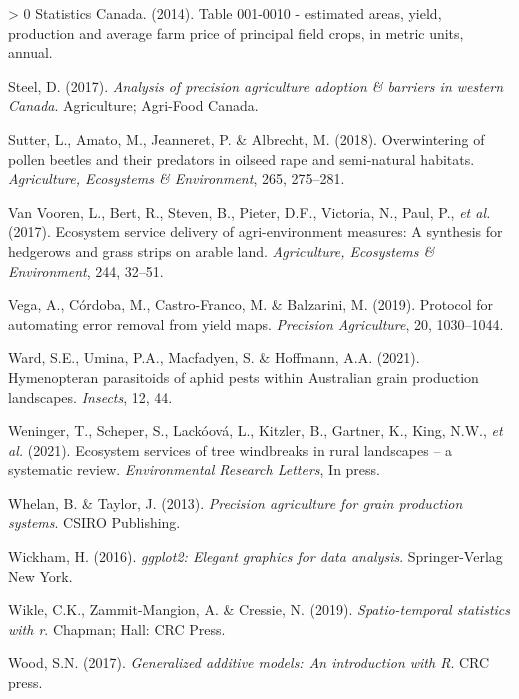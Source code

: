 \documentclass[]{elsarticle} %
\newlength{\cslhangindent}
\newenvironment{CSLReferences}[3] %
 {%
  \setlength{\parindent}{0pt}
  \ifodd #1 \everypar{\setlength{\hangindent}{\cslhangindent}}\ignorespaces\fi
  \ifnum #2 > 0
  \setlength{\parskip}{#2\baselineskip}
  \fi
 }%
 {}
\begin{document}
\begin{CSLReferences}{1}{0}
\leavevmode\hypertarget{ref-statscan_canola2014}{}%
Statistics Canada. (2014). Table 001-0010 - estimated areas, yield, production and average farm price of principal field crops, in metric units, annual.

\leavevmode\hypertarget{ref-steel2017}{}%
Steel, D. (2017). \emph{Analysis of precision agriculture adoption \& barriers in western {Canada}}. Agriculture; Agri-Food Canada.

\leavevmode\hypertarget{ref-sutter2018b}{}%
Sutter, L., Amato, M., Jeanneret, P. \& Albrecht, M. (2018). Overwintering of pollen beetles and their predators in oilseed rape and semi-natural habitats. \emph{Agriculture, Ecosystems {\&} Environment}, 265, 275--281.

\leavevmode\hypertarget{ref-vanVooren2017}{}%
Van Vooren, L., Bert, R., Steven, B., Pieter, D.F., Victoria, N., Paul, P., \emph{et al.} (2017). Ecosystem service delivery of agri-environment measures: A synthesis for hedgerows and grass strips on arable land. \emph{Agriculture, Ecosystems {\&} Environment}, 244, 32--51.

\leavevmode\hypertarget{ref-vega2019}{}%
Vega, A., Córdoba, M., Castro-Franco, M. \& Balzarini, M. (2019). Protocol for automating error removal from yield maps. \emph{Precision Agriculture}, 20, 1030--1044.

\leavevmode\hypertarget{ref-ward2021}{}%
Ward, S.E., Umina, P.A., Macfadyen, S. \& Hoffmann, A.A. (2021). Hymenopteran parasitoids of aphid pests within {Australian} grain production landscapes. \emph{Insects}, 12, 44.

\leavevmode\hypertarget{ref-weninger2021}{}%
Weninger, T., Scheper, S., Lackóová, L., Kitzler, B., Gartner, K., King, N.W., \emph{et al.} (2021). Ecosystem services of tree windbreaks in rural landscapes -- a systematic review. \emph{Environmental Research Letters}, In press.

\leavevmode\hypertarget{ref-whelan2013}{}%
Whelan, B. \& Taylor, J. (2013). \emph{Precision agriculture for grain production systems}. CSIRO Publishing.

\leavevmode\hypertarget{ref-wickham2016}{}%
Wickham, H. (2016). \emph{{ggplot2}: Elegant graphics for data analysis}. Springer-Verlag New York.

\leavevmode\hypertarget{ref-wickle2019}{}%
Wikle, C.K., Zammit-Mangion, A. \& Cressie, N. (2019). \emph{Spatio-temporal statistics with r}. Chapman; Hall: CRC Press.

\leavevmode\hypertarget{ref-wood2017}{}%
Wood, S.N. (2017). \emph{Generalized additive models: An introduction with {R}}. CRC press.


\end{CSLReferences}
\end{document}
